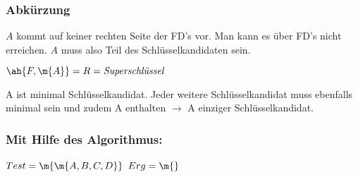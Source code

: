 \documentclass{lehramt-informatik-haupt}
\begin{document}
%

\subsubsection{Abkürzung}

$A$ kommt auf keiner rechten Seite der FD’s vor.
Man kann es über FD's nicht erreichen. $A$ muss also Teil des
Schlüsselkandidaten sein.

$\ah{F, \m{A}} = R = \textit{Superschlüssel}$

A ist minimal Schlüsselkandidat.
%
Jeder weitere Schlüsselkandidat muss ebenfalls minimal sein und zudem
A enthalten $\rightarrow$ A einziger Schlüsselkandidat.

%

\subsubsection{Mit Hilfe des Algorithmus:}

$Test = \m{\m{A, B, C, D}}$ $Erg = \m{}$
\end{document}

